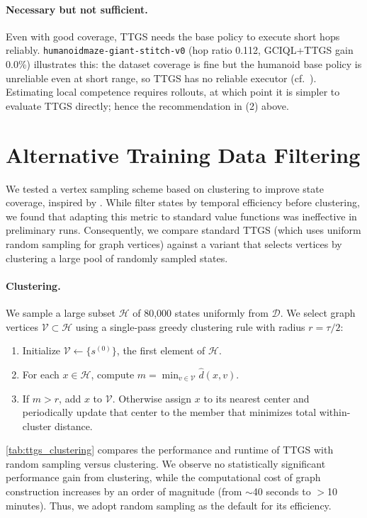 \documentclass{article} %
\begin{document}
\paragraph{Necessary but not sufficient.} Even with good coverage, TTGS needs the base policy to execute short hops reliably. \texttt{humanoidmaze-giant-stitch-v0} (hop ratio 0.112, GCIQL+TTGS gain 0.0\%) illustrates this: the dataset coverage is fine but the humanoid base policy is unreliable even at short range, so TTGS has no reliable executor (cf.\ ). Estimating local competence requires rollouts, at which point it is simpler to evaluate TTGS directly; hence the recommendation in (2) above.


\section{Alternative Training Data Filtering} \label{apdx:data_filtering}

We tested a vertex sampling scheme based on clustering to improve state coverage, inspired by \citet{gas_baek2025}. While \citet{gas_baek2025} filter states by temporal efficiency before clustering, we found that adapting this metric to standard value functions was ineffective in preliminary runs. Consequently, we compare standard TTGS (which uses uniform random sampling for graph vertices) against a variant that selects vertices by clustering a large pool of randomly sampled states.

\paragraph{Clustering.}
We sample a large subset $\mathcal{H}$ of 80,000 states uniformly from $\mathcal{D}$. We select graph vertices $\mathcal{V}\subset\mathcal{H}$ using a single-pass greedy clustering rule with radius $r = \tau/2$:
\begin{enumerate}
\item Initialize $\mathcal{V}\leftarrow\{s^{(0)}\}$, the first element of $\mathcal{H}$.
\item For each $x\in\mathcal{H}$, compute $m=\min_{v\in\mathcal{V}}\hat d(x,v)$.
\item If $m>r$, add $x$ to $\mathcal{V}$. Otherwise assign $x$ to its nearest center and periodically update that center to the member that minimizes total within-cluster distance.
\end{enumerate}

\autoref{tab:ttgs_clustering} compares the performance and runtime of TTGS with random sampling versus clustering. We observe no statistically significant performance gain from clustering, while the computational cost of graph construction increases by an order of magnitude (from $\sim$40 seconds to $>$10 minutes). Thus, we adopt random sampling as the default for its efficiency.
\end{document}
